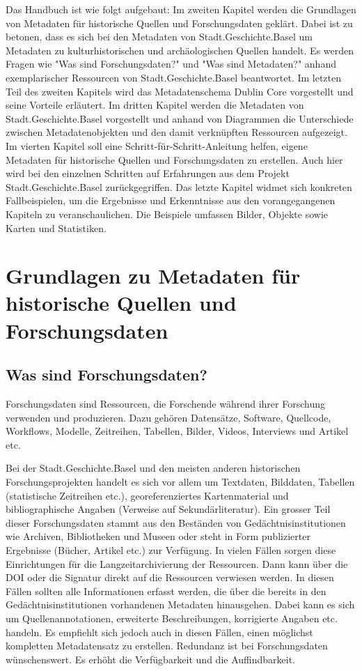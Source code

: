 \documentclass[
  letterpaper,
  DIV=11,
  numbers=noendperiod,
  landscape,
  a4paper,
  geometry:margin=1in]{scrartcl}
\begin{document}
Das Handbuch ist wie folgt aufgebaut: Im zweiten Kapitel werden die
Grundlagen von Metadaten für historische Quellen und Forschungsdaten
geklärt. Dabei ist zu betonen, dass es sich bei den Metadaten von
Stadt.Geschichte.Basel um Metadaten zu kulturhistorischen und
archäologischen Quellen handelt. Es werden Fragen wie "Was sind
Forschungsdaten?" und "Was sind Metadaten?" anhand exemplarischer
Ressourcen von Stadt.Geschichte.Basel beantwortet. Im letzten Teil des
zweiten Kapitels wird das Metadatenschema Dublin Core vorgestellt und
seine Vorteile erläutert. Im dritten Kapitel werden die Metadaten von
Stadt.Geschichte.Basel vorgestellt und anhand von Diagrammen die
Unterschiede zwischen Metadatenobjekten und den damit verknüpften
Ressourcen aufgezeigt. Im vierten Kapitel soll eine
Schritt-für-Schritt-Anleitung helfen, eigene Metadaten für historische
Quellen und Forschungsdaten zu erstellen. Auch hier wird bei den
einzelnen Schritten auf Erfahrungen aus dem Projekt
Stadt.Geschichte.Basel zurückgegriffen. Das letzte Kapitel widmet sich
konkreten Fallbeispielen, um die Ergebnisse und Erkenntnisse aus den
vorangegangenen Kapiteln zu veranschaulichen. Die Beispiele umfassen
Bilder, Objekte sowie Karten und Statistiken.

\section{Grundlagen zu Metadaten für historische Quellen und
Forschungsdaten}\label{grundlagen-zu-metadaten-fuxfcr-historische-quellen-und-forschungsdaten}

\subsection{Was sind Forschungsdaten?}\label{was-sind-forschungsdaten}

Forschungsdaten sind Ressourcen, die Forschende während ihrer Forschung
verwenden und produzieren. Dazu gehören Datensätze, Software, Quellcode,
Workflows, Modelle, Zeitreihen, Tabellen, Bilder, Videos, Interviews und
Artikel etc.

Bei der Stadt.Geschichte.Basel und den meisten anderen historischen
Forschungsprojekten handelt es sich vor allem um Textdaten, Bilddaten,
Tabellen (statistische Zeitreihen etc.), georeferenziertes
Kartenmaterial und bibliographische Angaben (Verweise auf
Sekundärliteratur). Ein grosser Teil dieser Forschungsdaten stammt aus
den Beständen von Gedächtnisinstitutionen wie Archiven, Bibliotheken und
Museen oder steht in Form publizierter Ergebnisse (Bücher, Artikel etc.)
zur Verfügung. In vielen Fällen sorgen diese Einrichtungen für die
Langzeitarchivierung der Ressourcen. Dann kann über die DOI oder die
Signatur direkt auf die Ressourcen verwiesen werden. In diesen Fällen
sollten alle Informationen erfasst werden, die über die bereits in den
Gedächtnisinstitutionen vorhandenen Metadaten hinausgehen. Dabei kann es
sich um Quellenannotationen, erweiterte Beschreibungen, korrigierte
Angaben etc. handeln. Es empfiehlt sich jedoch auch in diesen Fällen,
einen möglichst kompletten Metadatensatz zu erstellen. Redundanz ist bei
Forschungsdaten wünschenswert. Es erhöht die Verfügbarkeit und die
Auffindbarkeit.
\end{document}
